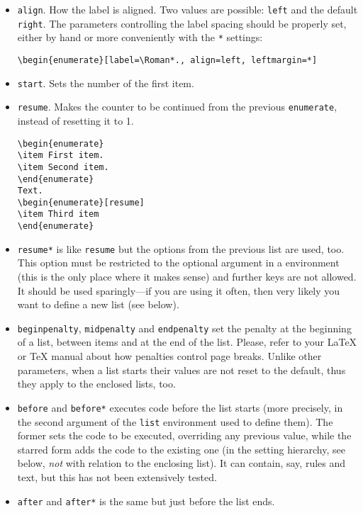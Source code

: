\documentclass{article}
\begin{document}
\begin{itemize}
    
\item \verb|align|. How the label is aligned. Two values
are possible: \verb|left| and the default \verb|right|.
The parameters controlling the label spacing should be
properly set, either by hand or more conveniently with
the \verb|*| settings:
\begin{verbatim}
\begin{enumerate}[label=\Roman*., align=left, leftmargin=*]
\end{verbatim}

\item \verb|start|. Sets the number of the first item.

\item \verb|resume|. Makes the counter to be continued
from the previous \verb|enumerate|, instead of resetting it
to 1.
\begin{verbatim}
\begin{enumerate}
\item First item.
\item Second item.
\end{enumerate}
Text.
\begin{enumerate}[resume]
\item Third item
\end{enumerate}
\end{verbatim}

\item \verb|resume*| is like \verb|resume| but the options from the
previous list are used, too.  This option must be restricted to the
optional argument in a environment (this is the only place where it
makes sense) and further keys are not allowed. It should be used
sparingly---if you are using it often, then very likely you want
to define a new list (see below). 

\item \verb|beginpenalty|, \verb|midpenalty| and \verb|endpenalty| set
the penalty at the beginning of a list, between items and at the end
of the list.  Please, refer to your \LaTeX{} or \TeX{} manual about
how penalties control page breaks. Unlike other parameters, when a
list starts their values are not reset to the default, thus they
apply to the enclosed lists, too.

\item \verb|before| and \verb|before*| executes code before the list
starts (more precisely, in the second argument of the \verb|list|
environment used to define them).  The former sets the code to be
executed, overriding any previous value, while the starred form adds
the code to the existing one (in the setting hierarchy, see below,
\textit{not} with relation to the enclosing list).  It can contain,
say, rules and text, but this has not been extensively tested.

\item \verb|after| and \verb|after*| is the same but just before
the list ends.

\end{itemize}
\end{document}
